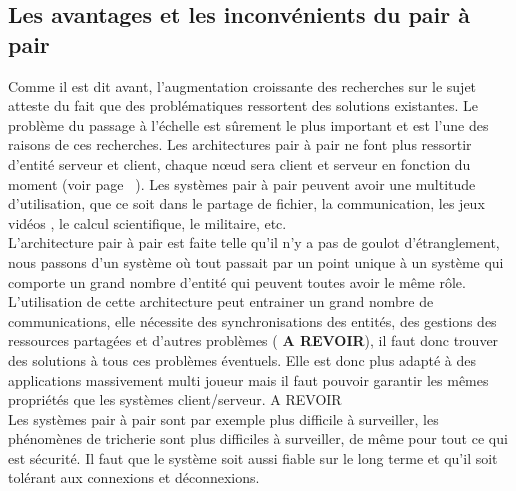 	\subsection{Les avantages et les inconvénients du pair à pair}
	Comme il est dit avant, l'augmentation croissante des recherches sur le sujet atteste du fait que des problématiques ressortent des solutions existantes. Le problème du passage à l'échelle est sûrement le plus important et est l'une des raisons de ces recherches. Les architectures pair à pair ne font plus ressortir d'entité serveur et client, chaque nœud sera client et serveur en fonction du moment (voir page ~\pageref{P2P/ClServ}). Les systèmes pair à pair peuvent avoir une multitude d'utilisation, que ce soit dans le partage de fichier, la communication, les jeux vidéos , le calcul scientifique, le militaire, etc. \\
	L'architecture pair à pair est faite telle qu'il n'y a pas de goulot d'étranglement, nous passons d'un système où tout passait par un point unique à un système qui comporte un grand nombre d'entité qui peuvent toutes avoir le même rôle. L'utilisation de cette architecture peut entrainer un grand nombre de communications, elle nécessite des synchronisations des entités, des gestions des ressources partagées et d'autres problèmes ( \textbf{A REVOIR}), il faut donc trouver des solutions à tous ces problèmes éventuels. Elle est donc plus adapté à des applications massivement multi joueur mais il faut pouvoir garantir les mêmes propriétés que les systèmes client/serveur. A REVOIR\\
	Les systèmes pair à pair sont par exemple plus difficile à surveiller, les phénomènes de tricherie sont plus difficiles à surveiller, de même pour tout ce qui est sécurité. Il faut que le système soit aussi fiable sur le long terme et qu'il soit tolérant aux connexions et déconnexions.
\\ \newline
	
